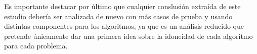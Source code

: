 \documentclass[a4paper, 11pt, titlepage]{article}
\begin{document}
    Es importante destacar por último que cualquier conslusión extraída de este estudio debería ser analizada de nuevo con más casos de prueba y usando distintas componentes para los algoritmos, ya que es un análisis reducido que pretende únicamente dar una primera idea sobre la idoneidad de cada algoritmo para cada problema.
\end{document}
